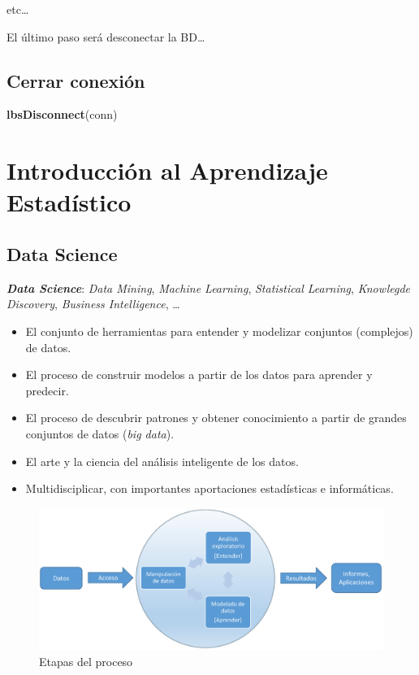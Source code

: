 \documentclass[]{book}
\newenvironment{Shaded}{\begin{snugshade}}{\end{snugshade}}
\newcommand{\KeywordTok}[1]{\textcolor[rgb]{0.13,0.29,0.53}{\textbf{#1}}}
\newcommand{\NormalTok}[1]{#1}
\begin{document}
etc\ldots{}

El último paso será desconectar la BD\ldots{}

\section{Cerrar conexión}\label{cerrar-conexiuxf3n}

\begin{Shaded}
\begin{Highlighting}[]
\KeywordTok{lbsDisconnect}\NormalTok{(conn)}
\end{Highlighting}
\end{Shaded}

\chapter{Introducción al Aprendizaje
Estadístico}\label{introducciuxf3n-al-aprendizaje-estaduxedstico}

\section{Data Science}\label{data-science}

\textbf{\emph{Data Science}}: \emph{Data Mining}, \emph{Machine
Learning}, \emph{Statistical Learning}, \emph{Knowlegde Discovery},
\emph{Business Intelligence}, \ldots{}

\begin{itemize}
\item
  El conjunto de herramientas para entender y modelizar conjuntos
  (complejos) de datos.
\item
  El proceso de construir modelos a partir de los datos para aprender y
  predecir.
\item
  El proceso de descubrir patrones y obtener conocimiento a partir de
  grandes conjuntos de datos (\emph{big data}).
\item
  El arte y la ciencia del análisis inteligente de los datos.
\item
  Multidisciplicar, con importantes aportaciones estadísticas e
  informáticas.
\end{itemize}

\begin{figure}
\includegraphics[width=0.8\linewidth]{images/esquema2} \caption{Etapas del proceso}\label{fig:esquema}
\end{figure}
\end{document}
